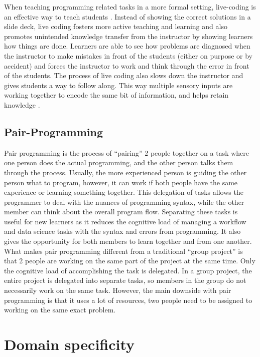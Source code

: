 \documentclass[../main.tex]{subfiles}
\begin{document}
        When teaching programming related tasks in a more formal setting, live-coding is an effective way to teach students . Instead of showing the correct solutions in a slide deck, live coding fosters more active teaching and learning and also promotes unintended knowledge transfer from the instructor by showing learners how things are done. Learners are able to see how problems are diagnosed when the instructor to make mistakes in front of the students (either on purpose or by accident) and forces the instructor to work and think through the error in front of the students. The process of live coding also slows down the instructor and gives students a way to follow along. This way multiple sensory inputs are working together to encode the same bit of information, and helps retain knowledge .
        
        \subsection{Pair-Programming}
        
        Pair programming is the process of “pairing” 2 people together on a task where one person does the actual programming, and the other person talks them through the process. Usually, the more experienced person is guiding the other person what to program, however, it can work if both people have the same experience or learning something together. This delegation of tasks allows the programmer to deal with the nuances of programming syntax, while the other member can think about the overall program flow. Separating these tasks is useful for new learners as it reduces the cognitive load of managing a workflow and data science tasks with the syntax and errors from programming. It also gives the opportunity for both members to learn together and from one another. What makes pair programming different from a traditional “group project” is that 2 people are working on the same part of the project at the same time. Only the cognitive load of accomplishing the task is delegated. In a group project, the entire project is delegated into separate tasks, so members in the group do not necessarily work on the same task. However, the main downside with pair programming is that it uses a lot of resources, two people need to be assigned to working on the same exact problem.

    \section{Domain specificity}
        \label{se:intro-domain-specificity}
\end{document}

